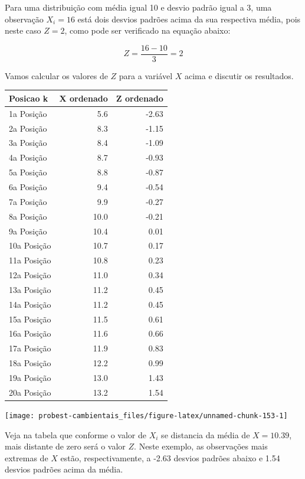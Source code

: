 \documentclass[
]{book}
\begin{document}
Para uma distribuição com média igual 10 e desvio padrão igual a 3, uma observação \(X_i = 16\) está dois desvios padrões acima da sua respectiva média, pois neste caso \(Z = 2\), como pode ser verificado na equação abaixo:

\[Z = \frac{16 - 10}{3} = 2\]

Vamos calcular os valores de \(Z\) para a variável \(X\) acima e discutir os resultados.

\begin{tabular}{l|r|r}
\hline
Posicao k & X ordenado & Z ordenado\\
\hline
1a Posição & 5.6 & -2.63\\
\hline
2a Posição & 8.3 & -1.15\\
\hline
3a Posição & 8.4 & -1.09\\
\hline
4a Posição & 8.7 & -0.93\\
\hline
5a Posição & 8.8 & -0.87\\
\hline
6a Posição & 9.4 & -0.54\\
\hline
7a Posição & 9.9 & -0.27\\
\hline
8a Posição & 10.0 & -0.21\\
\hline
9a Posição & 10.4 & 0.01\\
\hline
10a Posição & 10.7 & 0.17\\
\hline
11a Posição & 10.8 & 0.23\\
\hline
12a Posição & 11.0 & 0.34\\
\hline
13a Posição & 11.2 & 0.45\\
\hline
14a Posição & 11.2 & 0.45\\
\hline
15a Posição & 11.5 & 0.61\\
\hline
16a Posição & 11.6 & 0.66\\
\hline
17a Posição & 11.9 & 0.83\\
\hline
18a Posição & 12.2 & 0.99\\
\hline
19a Posição & 13.0 & 1.43\\
\hline
20a Posição & 13.2 & 1.54\\
\hline
\end{tabular}

\begin{center}\texttt{[image: probest-cambientais\_files/figure-latex/unnamed-chunk-153-1]} \end{center}

Veja na tabela que conforme o valor de \(X_i\) se distancia da média de \(X = 10.39\), mais distante de zero será o valor \(Z\). Neste exemplo, as observações mais extremas de \(X\) estão, respectivamente, a -2.63 desvios padrões abaixo e 1.54 desvios padrões acima da média.
\end{document}
